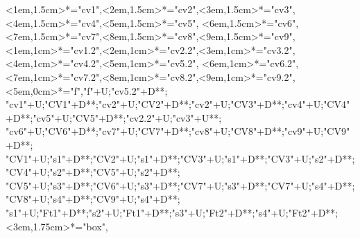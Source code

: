 \begin{multicols}{2}
\begin{exe}
{\begin{xlist}
{		<1em,1.5cm>*="cv1",<2em,1.5cm>*="cv2",<3em,1.5cm>*\as{ }="cv3",<4em,1.5cm>*="cv4",<5em,1.5cm>*\as{\j}="cv5",
		<6em,1.5cm>*="cv6",<7em,1.5cm>*\as{ }="cv7",<8em,1.5cm>*="cv8",<9em,1.5cm>*\as{ }="cv9",
		<1em,1cm>*="cv1.2",<2em,1cm>*="cv2.2",<3em,1cm>*\as{ }="cv3.2",<4em,1cm>*="cv4.2",<5em,1cm>*\as{\j}="cv5.2",
		<6em,1cm>*="cv6.2",<7em,1cm>*\as{ }="cv7.2",<8em,1cm>*="cv8.2",<9em,1cm>*\as{ }="cv9.2",
		<5em,0cm>*\as{\tsc{[+fr.]}}="f","f"+U;"cv5.2"+D**\dir{-};
		"cv1"+U;"CV1"+D**\dir{-};"cv2"+U;"CV2"+D**\dir{-};"cv2"+U;"CV3"+D**;"cv4"+U;"CV4"+D**\dir{-};"cv5"+U;"CV5"+D**\dir{-};"cv2.2"+U;"cv3"+U**;
		"cv6"+U;"CV6"+D**\dir{-};"cv7"+U;"CV7"+D**\dir{};"cv8"+U;"CV8"+D**\dir{-};"cv9"+U;"CV9"+D**\dir{};
		"CV1"+U;"s1"+D**\dir{-};"CV2"+U;"s1"+D**\dir{-};"CV3"+U;"s1"+D**\dir{};"CV3"+U;"s2"+D**\dir{-};"CV4"+U;"s2"+D**\dir{-};"CV5"+U;"s2"+D**\dir{};
		"CV5"+U;"s3"+D**\dir{-};"CV6"+U;"s3"+D**\dir{-};"CV7"+U;"s3"+D**\dir{-};"CV7"+U;"s4"+D**\dir{-};"CV8"+U;"s4"+D**\dir{-};"CV9"+U;"s4"+D**\dir{-};
		"s1"+U;"Ft1"+D**\dir{-};"s2"+U;"Ft1"+D**\dir{-};"s3"+U;"Ft2"+D**\dir{-};"s4"+U;"Ft2"+D**\dir{-};
		<3em,1.75cm>*="box",
	\endxy}
	\end{xlist}}
\end{exe}
\end{multicols}

